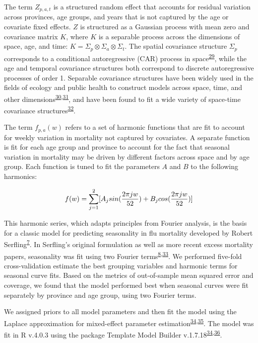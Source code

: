 \documentclass[
]{article}
\begin{document}
The term \(Z_{p,a,t}\) is a structured random effect that accounts for residual variation across provinces, age groups, and years that is not captured by the age or covariate fixed effects. \(Z\) is structured as a Gaussian process with mean zero and covariance matrix \(K\), where \(K\) is a separable process across the dimensions of space, age, and time: \(K = \Sigma_p \otimes \Sigma_a \otimes \Sigma_t\). The spatial covariance structure \(\Sigma_p\) corresponds to a conditional autoregressive (CAR) process in space\textsuperscript{\protect\hyperlink{ref-Riebler2016}{29}}, while the age and temporal covariance structures both correspond to discrete autoregressive processes of order 1. Separable covariance structures have been widely used in the fields of ecology and public health to construct models across space, time, and other dimensions\textsuperscript{\protect\hyperlink{ref-Thorson2017}{30},\protect\hyperlink{ref-Wakefield2019}{31}}⁠, and have been found to fit a wide variety of space-time covariance structures\textsuperscript{\protect\hyperlink{ref-Huang2007}{32}}.

The term \(f_{p,a}(w)\) refers to a set of harmonic functions that are fit to account for weekly variation in mortality not captured by covariates. A separate function is fit for each age group and province to account for the fact that seasonal variation in mortality may be driven by different factors across space and by age group. Each function is tuned to fit the parameters \(A\) and \(B\) to the following harmonics:

\[f(w) = \large\sum_{j=1}^{2}[A_{j}sin(\frac{2\pi j w}{52}) + B_{j}cos(\frac{2\pi j w}{52})]\]

This harmonic series, which adapts principles from Fourier analysis, is the basis for a classic model for predicting seasonality in flu mortality developed by Robert Serfling\textsuperscript{\protect\hyperlink{ref-Serfling1963}{7}}⁠. In Serfling's original formulation as well as more recent excess mortality papers, seasonality was fit using two Fourier terms\textsuperscript{\protect\hyperlink{ref-Weinberger2020a}{8},\protect\hyperlink{ref-Woolf2020}{33}}⁠. We performed five-fold cross-validation estimate the best grouping variables and harmonic terms for seasonal curve fits. Based on the metrics of out-of-sample mean squared error and coverage, we found that the model performed best when seasonal curves were fit separately by province and age group, using two Fourier terms.

We assigned priors to all model parameters and then fit the model using the Laplace approximation for mixed-effect parameter estimation\textsuperscript{\protect\hyperlink{ref-Kristensen2016}{34},\protect\hyperlink{ref-Thorson2016}{35}}⁠. The model was fit in R v.4.0.3 using the package Template Model Builder v.1.7.18\textsuperscript{\protect\hyperlink{ref-Kristensen2016}{34},\protect\hyperlink{ref-RCoreTeam2018}{36}}.
\end{document}
